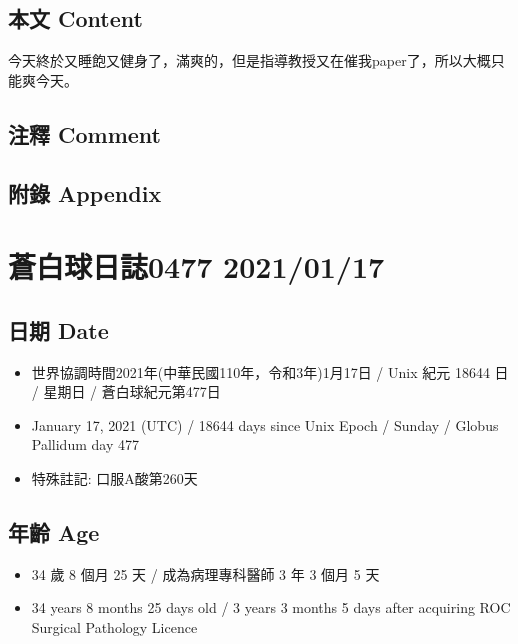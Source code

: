 \documentclass[a5paper, 11pt
]{book}
\providecommand{\tightlist}{%
  \setlength{\itemsep}{0pt}\setlength{\parskip}{0pt}}
\begin{document}
\hypertarget{ux672cux6587-content-46}{%
\subsection{本文 Content}\label{ux672cux6587-content-46}}

今天終於又睡飽又健身了，滿爽的，但是指導教授又在催我paper了，所以大概只能爽今天。

\hypertarget{ux6ce8ux91cb-comment-46}{%
\subsection{注釋 Comment}\label{ux6ce8ux91cb-comment-46}}

\hypertarget{ux9644ux9304-appendix-46}{%
\subsection{附錄 Appendix}\label{ux9644ux9304-appendix-46}}

\hypertarget{ux84bcux767dux7403ux65e5ux8a8c0477-20210117}{%
\section{蒼白球日誌0477
2021/01/17}\label{ux84bcux767dux7403ux65e5ux8a8c0477-20210117}}

\hypertarget{ux65e5ux671f-date-47}{%
\subsection{日期 Date}\label{ux65e5ux671f-date-47}}

\begin{itemize}
\tightlist
\item
  世界協調時間2021年(中華民國110年，令和3年)1月17日 / Unix 紀元 18644 日
  / 星期日 / 蒼白球紀元第477日
\item
  January 17, 2021 (UTC) / 18644 days since Unix Epoch / Sunday / Globus
  Pallidum day 477
\item
  特殊註記: 口服A酸第260天
\end{itemize}

\hypertarget{ux5e74ux9f61-age-47}{%
\subsection{年齡 Age}\label{ux5e74ux9f61-age-47}}

\begin{itemize}
\tightlist
\item
  34 歲 8 個月 25 天 / 成為病理專科醫師 3 年 3 個月 5 天
\item
  34 years 8 months 25 days old / 3 years 3 months 5 days after
  acquiring ROC Surgical Pathology Licence
\end{itemize}
\end{document}
